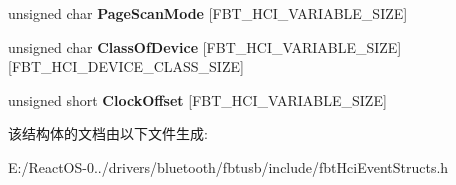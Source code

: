\begin{DoxyCompactItemize}
\item 
\mbox{\label{struct_f_b_t___h_c_i___i_n_q_u_i_r_y___r_e_s_u_l_t_ae6716f87df948eaf83f3fdec732ef7b9}} 
unsigned char {\bfseries Page\+Scan\+Mode} \mbox{[}F\+B\+T\+\_\+\+H\+C\+I\+\_\+\+V\+A\+R\+I\+A\+B\+L\+E\+\_\+\+S\+I\+ZE\mbox{]}
\item 
\mbox{\label{struct_f_b_t___h_c_i___i_n_q_u_i_r_y___r_e_s_u_l_t_a9b874b81f1105cd65ed05ad6adfb4e1f}} 
unsigned char {\bfseries Class\+Of\+Device} \mbox{[}F\+B\+T\+\_\+\+H\+C\+I\+\_\+\+V\+A\+R\+I\+A\+B\+L\+E\+\_\+\+S\+I\+ZE\mbox{]}\mbox{[}F\+B\+T\+\_\+\+H\+C\+I\+\_\+\+D\+E\+V\+I\+C\+E\+\_\+\+C\+L\+A\+S\+S\+\_\+\+S\+I\+ZE\mbox{]}
\item 
\mbox{\label{struct_f_b_t___h_c_i___i_n_q_u_i_r_y___r_e_s_u_l_t_af613a29326a72f32f442f1c5c31ad5cf}} 
unsigned short {\bfseries Clock\+Offset} \mbox{[}F\+B\+T\+\_\+\+H\+C\+I\+\_\+\+V\+A\+R\+I\+A\+B\+L\+E\+\_\+\+S\+I\+ZE\mbox{]}
\end{DoxyCompactItemize}


该结构体的文档由以下文件生成\+:\begin{DoxyCompactItemize}
\item 
E\+:/\+React\+O\+S-\/0../drivers/bluetooth/fbtusb/include/fbt\+Hci\+Event\+Structs.\+h\end{DoxyCompactItemize}
